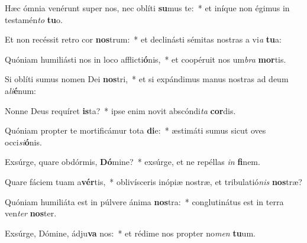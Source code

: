 \item Hæc ómnia venérunt super nos, nec oblíti \textbf{su}mus te:~* et iníque non égimus in testamén\textit{to} \textbf{tu}o.
\item Et non recéssit retro cor \textbf{nos}trum:~* et declinásti sémitas nostras a vi\textit{a} \textbf{tu}a:
\item Quóniam humiliásti nos in loco afflicti\textbf{ó}nis,~* et coopéruit nos um\textit{bra} \textbf{mor}tis.
\item Si oblíti sumus nomen Dei \textbf{nos}tri,~* et si expándimus manus nostras ad deum a\textit{li}\textbf{é}num:
\item Nonne Deus requíret \textbf{is}ta?~* ipse enim novit abscóndi\textit{ta} \textbf{cor}dis.
\item Quóniam propter te mortificámur tota \textbf{di}e:~* æstimáti sumus sicut oves occi\textit{si}\textbf{ó}nis.
\item Exsúrge, quare obdórmis, \textbf{Dó}mine?~* exsúrge, et ne repéllas \textit{in} \textbf{fi}nem.
\item Quare fáciem tuam a\textbf{vér}tis,~* oblivísceris inópiæ nostræ, et tribulatió\textit{nis} \textbf{nos}træ?
\item Quóniam humiliáta est in púlvere ánima \textbf{nos}tra:~* conglutinátus est in terra ven\textit{ter} \textbf{nos}ter.
\item Exsúrge, Dómine, ádju\textbf{va} nos:~* et rédime nos propter no\textit{men} \textbf{tu}um.
